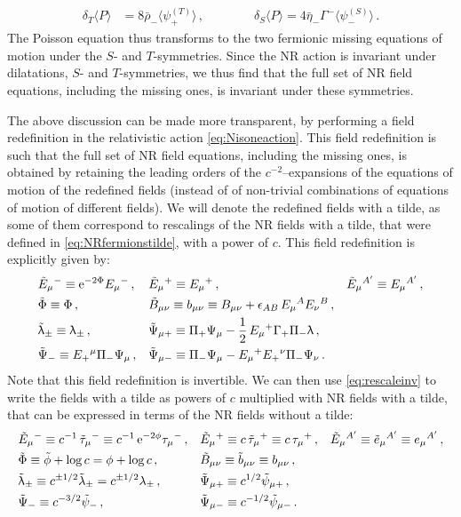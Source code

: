 \documentclass[a4paper,10pt,openany]{article}
\def\rme{\mathrm{e}}
\begin{document}
	\begin{align}
		\label{eq:STPoisson}
		\delta_T \langle P \rangle &= 8 \bar{\rho}_- \langle \psi^{(T)}_+ \rangle \,, \qquad \qquad \delta_S \langle P \rangle = 4 \bar{\eta}_- \Gamma^- \langle \psi_-^{(S)} \rangle \,.
	\end{align}
	The Poisson equation thus transforms to the two fermionic missing equations of motion under the $S$- and $T$-symmetries. Since the NR action is invariant under dilatations, $S$- and $T$-symmetries, we thus find that the full set of NR field equations, including the missing ones, is invariant under these symmetries.
	
	The above discussion can be made more transparent, by performing a field redefinition in the relativistic action \eqref{eq:Nisoneaction}. This field redefinition is such that the full set of NR field equations, including the missing ones, is obtained by retaining the leading orders of the $c^{-2}$--expansions of the equations of motion of the redefined fields (instead of of non-trivial combinations of equations of motion of different fields). We will denote the redefined fields with a tilde, as some of them correspond to rescalings of the NR fields with a tilde, that were defined in \eqref{eq:NRfermionstilde}, with a power of $c$. This field redefinition is explicitly given by:
	\begin{align}\label{eq:Einsteinframe}
		&\tilde E_\mu{}^- \equiv \rme^{-2\Phi}E_\mu{}^-\,, && \tilde E_\mu{}^+ \equiv E_\mu{}^+\,,&&\tilde E_\mu{}^{A'} \equiv E_\mu{}^{A'}\,,\notag\\
		&\tilde \Phi \equiv \Phi\,,&&\tilde B_{\mu\nu} \equiv b_{\mu\nu} \equiv B_{\mu\nu} +\epsilon_{AB}\,E_\mu{}^A E_\nu{}^B\,, \notag\\
		&\tilde\uplambda_\pm \equiv \uplambda_\pm \,, && \tilde\Psi_{\mu +} \equiv \Pi_+\Psi_\mu - \frac12\,E_\mu{}^+\Gamma_+\Pi_-\uplambda\,,\notag\\
		&\tilde\Psi_{-} \equiv E_+{}^\mu\Pi_-\Psi_\mu\,, && \tilde\Psi_{\mu-} \equiv \Pi_-\Psi_\mu - E_\mu{}^+E_+{}^\nu\Pi_-\Psi_\nu\,.
	\end{align}
	Note that this field redefinition is invertible. We can then use \eqref{eq:rescaleinv} to write the fields with a tilde as powers of $c$ multiplied with NR fields with a tilde, that can be expressed in terms of the NR fields without a tilde:
	\begin{align}\label{eq:Einsteinframec}
		&\tilde E_\mu{}^- \equiv c^{-1}\, \tilde{\tau}_\mu{}^- \equiv c^{-1}\, \rme^{-2\phi} \tau_\mu{}^-\,, && \tilde E_\mu{}^+ \equiv c \, \tilde{\tau}_\mu{}^+ \equiv c\, \tau_\mu{}^+ \,,&&\tilde E_\mu{}^{A'} \equiv \tilde{e}_\mu{}^{A'} \equiv e_\mu{}^{A'}\,,\notag\\
		&\tilde \Phi \equiv \tilde{\phi} + \log c = \phi + \log c \,,&&\tilde B_{\mu\nu} \equiv \tilde{b}_{\mu\nu} \equiv b_{\mu\nu}\,, \notag\\
		&\tilde\uplambda_\pm \equiv c^{\pm 1/2} \tilde\lambda_\pm = c^{\pm 1/2} \lambda_\pm \,, && \tilde\Psi_{\mu +} \equiv c^{1/2} \tilde{\psi}_{\mu +} \,,\notag\\
		&\tilde\Psi_{-} \equiv c^{-3/2} \tilde{\psi}_- \,, && \tilde\Psi_{\mu-} \equiv c^{-1/2} \tilde{\psi}_{\mu -}\,.
	\end{align}
\end{document}
